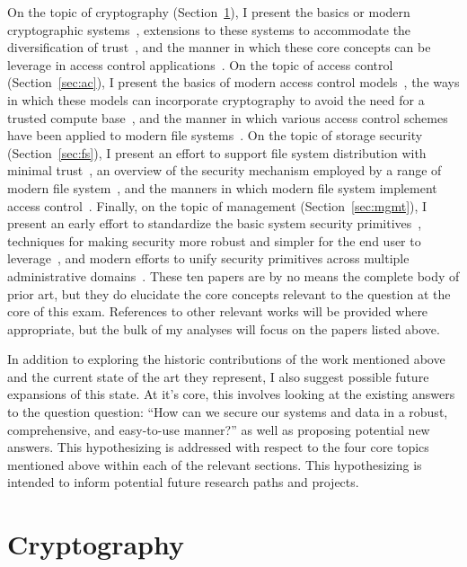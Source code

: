 \documentclass{sig-alternate}
\begin{document}
On the topic of cryptography (Section~\ref{sec:crypto}), I present the
basics or modern cryptographic systems~\cite{Diffie1976}, extensions
to these systems to accommodate the diversification of
trust~\cite{Shamir1979}, and the manner in which these core concepts
can be leverage in access control
applications~\cite{Bethencourt2007}. On the topic of access control
(Section~\ref{sec:ac}), I present the basics of modern access control
models~\cite{Sandhu1996}, the ways in which these models can
incorporate cryptography to avoid the need for a trusted compute
base~\cite{Bethencourt2007}, and the manner in which various access
control schemes have been applied to modern file
systems~\cite{Miltchev2008}. On the topic of storage security
(Section~\ref{sec:fs}), I present an effort to support file system
distribution with minimal trust~\cite{Mazieres1999}, an overview of
the security mechanism employed by a range of modern file
system~\cite{Kher2005}, and the manners in which modern file system
implement access control~\cite{Miltchev2008}. Finally, on the topic of
management (Section~\ref{sec:mgmt}), I present an early effort to
standardize the basic system security primitives~\cite{Samar1996},
techniques for making security more robust and simpler for the end
user to leverage~\cite{Cox2002}, and modern efforts to unify security
primitives across multiple administrative
domains~\cite{Morgan2004}. These ten papers are by no means the
complete body of prior art, but they do elucidate the core concepts
relevant to the question at the core of this exam. References to other
relevant works will be provided where appropriate, but the bulk of my
analyses will focus on the papers listed above.

In addition to exploring the historic contributions of the work
mentioned above and the current state of the art they represent, I
also suggest possible future expansions of this state. At it's core,
this involves looking at the existing answers to the question
question: ``How can we secure our systems and data in a robust,
comprehensive, and easy-to-use manner?'' as well as proposing
potential new answers. This hypothesizing is addressed with respect to
the four core topics mentioned above within each of the relevant
sections. This hypothesizing is intended to inform potential future
research paths and projects.

\newpage

\section{Cryptography}
\label{sec:crypto}
\end{document}
